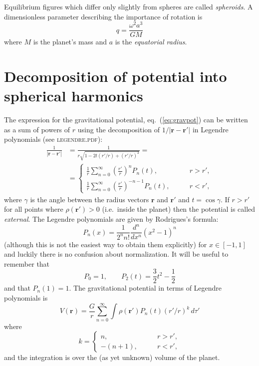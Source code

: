 \documentclass[amsmath,amsfonts,rmp,letterpaper]{revtex4}
\newcommand{\V}[1]{\mathbf{#1}} %
\newcommand{\abs}[1]{\left\vert#1\right\vert} %
\newcommand{\arr}{\V{r}}
\newcommand{\arp}{\V{r'}}
\begin{document}
Equilibrium figures which differ only slightly from spheres are called \emph
{spheroids}. A dimensionless parameter describing the importance of rotation is
\begin{equation}\label{eq:smallq}
q = \frac{\omega^2a^3}{GM}
\end{equation}
where $M$ is the planet's mass and $a$ is the \emph{equatorial radius}.

\section{Decomposition of potential into spherical harmonics}
\label{sec:spherical_harmonics}
The expression for the gravitational potential, eq.~(\ref{eq:gravpot}) can be
written as a sum of powers of $r$ using the decomposition of $1/\abs{\arr-\arp}$
in Legendre polynomials (see \textsc{legendre.pdf}):
\begin{equation}\label{eq:lege_exp}
\begin{split}
\frac{1}{\abs{\arr-\arp}} &= \frac{1}{r\sqrt{1 - 2t(r'/r) + (r'/r)^2}} = \\
&=
\begin{cases}
\frac{1}{r}\sum_{n=0}^{\infty}(\frac{r'}{r})^nP_n(t),&\qquad r>r',\\
\frac{1}{r}\sum_{n=0}^{\infty}(\frac{r'}{r})^{-n-1}P_n(t),&\qquad r<r',
\end{cases}
\end{split}
\end{equation}
where $\gamma$ is the angle between the radius vectors $\arr$ and $\arp$ and
$t=\cos\gamma$. If $r>r'$ for all points where $\rho(\arp)>0$ (i.e.~inside the
planet) then the potential is called \emph{external}. The Legendre polynomials are
given by Rodrigues's formula:
\begin{equation}\label{eq:rodrigues}
P_n(x) = \frac{1}{2^nn!}\frac{d^n}{dx^n}(x^2 - 1)^n
\end{equation}
(although this is not the easiest way to obtain them explicitly) for
$x\in{[-1,1]}$ and luckily there is no confusion about normalization. It will be
useful to remember that
\begin{equation*}
P_0 = 1, \qquad P_2(t) = \frac{3}{2}t^2 - \frac{1}{2}
\end{equation*}
and that $P_n(1)=1$.
The gravitational potential in terms of Legendre polynomials is
\begin{equation}\label{eq:lege_gravity}
V(\arr) = \frac{G}{r}\sum_{n=0}^\infty\int\rho(\arp)P_n(t)(r'/r)^k\,d\tau'
\end{equation}
where
\begin{equation*}
k=
\begin{cases}
n,&\qquad r>r',\\
-(n+1),&\qquad r<r',
\end{cases}
\end{equation*}
and the integration is over the (as yet unknown) volume of the planet.
\end{document}
